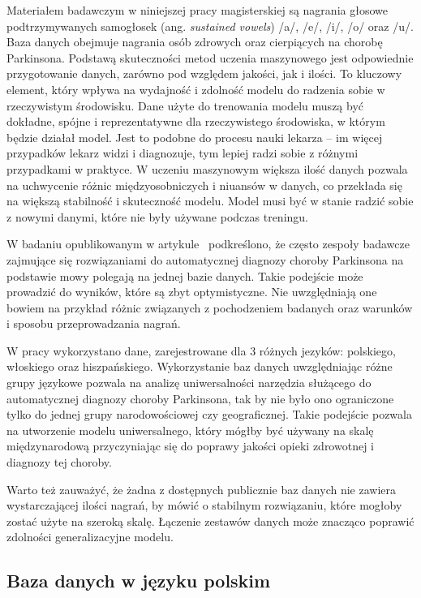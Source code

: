 Materiałem badawczym w niniejszej pracy magisterskiej są nagrania głosowe podtrzymywanych samogłosek (ang. \emph{sustained vowels}) /a/, /e/, /i/, /o/ oraz /u/.
Baza danych obejmuje nagrania osób zdrowych oraz cierpiących na chorobę Parkinsona.
Podstawą skuteczności metod uczenia maszynowego jest odpowiednie przygotowanie danych, zarówno pod względem jakości, jak i ilości.
To kluczowy element, który wpływa na wydajność i zdolność modelu do radzenia sobie w rzeczywistym środowisku.
Dane użyte do trenowania modelu muszą być dokładne, spójne i reprezentatywne dla rzeczywistego środowiska, w którym będzie działał model.
Jest to podobne do procesu nauki lekarza – im więcej przypadków lekarz widzi i diagnozuje, tym lepiej radzi sobie z różnymi przypadkami w praktyce.
W  uczeniu maszynowym większa ilość danych pozwala na uchwycenie różnic międzyosobniczych i niuansów w danych, co przekłada się na większą stabilność i skuteczność modelu.
Model musi być w stanie radzić sobie z nowymi danymi, które nie były używane podczas treningu.

W badaniu opublikowanym w artykule~\cite{SustainedVowelsProblems} podkreślono, że często zespoły badawcze zajmujące się rozwiązaniami do automatycznej diagnozy choroby Parkinsona na podstawie mowy polegają na jednej bazie danych.
Takie podejście może prowadzić do wyników, które są zbyt optymistyczne.
Nie uwzględniają one bowiem na przykład różnic związanych z pochodzeniem badanych oraz warunków i sposobu przeprowadzania nagrań.

W pracy wykorzystano dane, zarejestrowane dla 3 różnych jezyków: polskiego, włoskiego oraz hiszpańskiego.
Wykorzystanie baz danych uwzględniając różne grupy językowe pozwala na analizę uniwersalności narzędzia służącego do automatycznej diagnozy choroby Parkinsona, tak by nie było ono ograniczone tylko do jednej grupy narodowościowej czy geograficznej.
Takie podejście pozwala na utworzenie modelu uniwersalnego, który mógłby być używany na skalę międzynarodową przyczyniając się do poprawy jakości opieki zdrowotnej i diagnozy tej choroby.

Warto też zauważyć, że żadna z dostępnych publicznie baz danych nie zawiera wystarczającej ilości nagrań, by mówić o stabilnym rozwiązaniu, które mogłoby zostać użyte na szeroką skalę.
Łączenie zestawów danych może znacząco poprawić zdolności generalizacyjne modelu.

\subsection{Baza danych w języku polskim}
\label{subsec:polska-baza}

